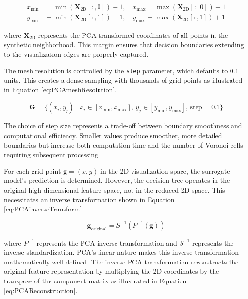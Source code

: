 \begin{equation}
\begin{aligned}
x_{\text{min}} &= \min(\mathbf{X}_{\text{2D}}[:, 0]) - 1, \quad x_{\text{max}} = \max(\mathbf{X}_{\text{2D}}[:, 0]) + 1 \\
y_{\text{min}} &= \min(\mathbf{X}_{\text{2D}}[:, 1]) - 1, \quad y_{\text{max}} = \max(\mathbf{X}_{\text{2D}}[:, 1]) + 1
\end{aligned}
\label{eq:PCABoundaries}
\end{equation}

where $\mathbf{X}_{\text{2D}}$ represents the PCA-transformed coordinates of all points in the synthetic neighborhood. This margin ensures that decision boundaries extending to the visualization edges are properly captured.

The mesh resolution is controlled by the \texttt{step} parameter, which defaults to 0.1 units. This creates a dense sampling with thousands of grid points as illustrated in Equation \ref{eq:PCAmeshResolution}.

\begin{equation}
\mathbf{G} = \{(x_i, y_j) \mid x_i \in [x_{\text{min}}, x_{\text{max}}], \, y_j \in [y_{\text{min}}, y_{\text{max}}], \, \text{step} = 0.1\}
\label{eq:PCAmeshResolution}
\end{equation}

The choice of step size represents a trade-off between boundary smoothness and computational efficiency. Smaller values produce smoother, more detailed boundaries but increase both computation time and the number of Voronoi cells requiring subsequent processing.

For each grid point $\mathbf{g} = (x, y)$ in the 2D visualization space, the surrogate model's prediction is determined. However, the decision tree operates in the original high-dimensional feature space, not in the reduced 2D space. This necessitates an inverse transformation shown in Equation \ref{eq:PCAinverseTransform}.

\begin{equation}
\mathbf{g}_{\text{original}} = S^{-1}(P^{-1}(\mathbf{g}))
\label{eq:PCAinverseTransform}
\end{equation}

where $P^{-1}$ represents the PCA inverse transformation and $S^{-1}$ represents the inverse standardization. PCA's linear nature makes this inverse transformation mathematically well-defined. The inverse PCA transformation reconstructs the original feature representation by multiplying the 2D coordinates by the transpose of the component matrix as illustrated in Equation \ref{eq:PCAReconstruction}.

